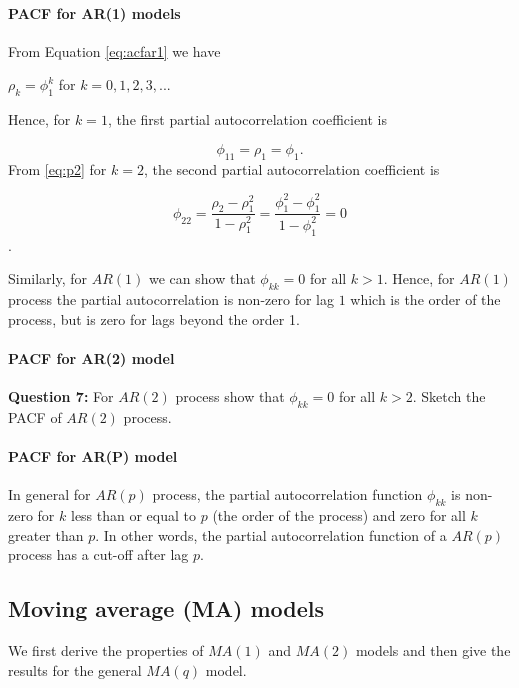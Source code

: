 \documentclass[]{book}
\let\oldparagraph\paragraph
\renewcommand{\paragraph}[1]{\oldparagraph{#1}\mbox{}}
\begin{document}
\hypertarget{pacf-for-ar1-models}{%
\paragraph{PACF for AR(1) models}\label{pacf-for-ar1-models}}

From Equation \eqref{eq:acfar1} we have

\(\rho_k=\phi_1^k\) for \(k=0, 1, 2, 3,...\)

Hence, for \(k=1\), the first partial autocorrelation coefficient is

\[\phi_{11}=\rho_1=\phi_1.\]
From \eqref{eq:p2} for \(k=2\), the second partial autocorrelation coefficient is

\[\phi_{22}=\frac{\rho_2-\rho_1^2}{1-\rho_1^2}=\frac{\phi_1^2-\phi_1^2}{1-\phi_1^2} = 0\].

Similarly, for \(AR(1)\) we can show that \(\phi_{kk}=0\) for all \(k > 1\). Hence, for \(AR(1)\) process the partial autocorrelation is non-zero for lag \(1\) which is the order of the process, but is zero for lags beyond the order 1.

\hypertarget{pacf-for-ar2-model}{%
\paragraph{PACF for AR(2) model}\label{pacf-for-ar2-model}}

\textbf{Question 7:} For \(AR(2)\) process show that \(\phi_{kk}=0\) for all \(k>2\). Sketch the PACF of \(AR(2)\) process.

\hypertarget{pacf-for-arp-model}{%
\paragraph{PACF for AR(P) model}\label{pacf-for-arp-model}}

In general for \(AR(p)\) process, the partial autocorrelation function \(\phi_{kk}\) is non-zero for \(k\) less than or equal to \(p\) (the order of the process) and zero for all \(k\) greater than \(p\). In other words, the partial autocorrelation function of a \(AR(p)\) process has a cut-off after lag \(p\).

\hypertarget{moving-average-ma-models-1}{%
\subsection{Moving average (MA) models}\label{moving-average-ma-models-1}}

We first derive the properties of \(MA(1)\) and \(MA(2)\) models and then give the results for the general \(MA(q)\) model.
\end{document}

